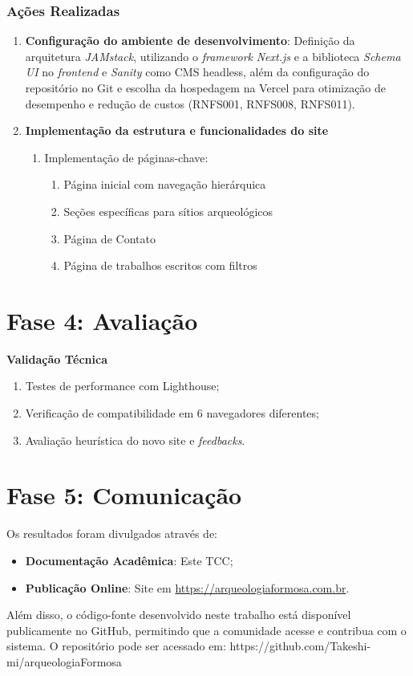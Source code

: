 \subsubsection*{Ações Realizadas}
\begin{enumerate}
\item \textbf{Configuração do ambiente de desenvolvimento}: Definição da arquitetura \textit{JAMstack}, utilizando o \textit{framework} \textit{Next.js} e a biblioteca \textit{Schema UI} no \textit{frontend} e \textit{Sanity} como CMS headless, além da configuração do repositório no Git e escolha da hospedagem na Vercel para otimização de desempenho e redução de custos (RNFS001, RNFS008, RNFS011).

    
    \item \textbf{Implementação da estrutura e funcionalidades do site}
    \begin{enumerate}
        \item Implementação de páginas-chave:
        \begin{enumerate}
            \item Página inicial com navegação hierárquica
            \item Seções específicas para sítios arqueológicos
            \item Página de Contato
            \item Página de trabalhos escritos com filtros
        \end{enumerate}
    \end{enumerate}
    
\end{enumerate}

\section{Fase 4: Avaliação} \label{sec:avaliacao-dsr}

    \textbf{Validação Técnica}
    \begin{enumerate}
        \item Testes de performance com Lighthouse;
        \item Verificação de compatibilidade em 6 navegadores diferentes;
        \item Avaliação heurística do novo site e \textit{feedbacks}.
    \end{enumerate}
    

\section{Fase 5: Comunicação} \label{sec:comunicacao-dsr}

Os resultados foram divulgados através de:
\begin{itemize}
    \item \textbf{Documentação Acadêmica}: Este TCC;
    \item \textbf{Publicação Online}: Site em \url{https://arqueologiaformosa.com.br}.
\end{itemize}

Além disso, o código-fonte desenvolvido neste trabalho está disponível publicamente no GitHub, permitindo que a comunidade acesse e contribua com o sistema. O repositório pode ser acessado em: https://github.com/Takeshi-mi/arqueologiaFormosa
